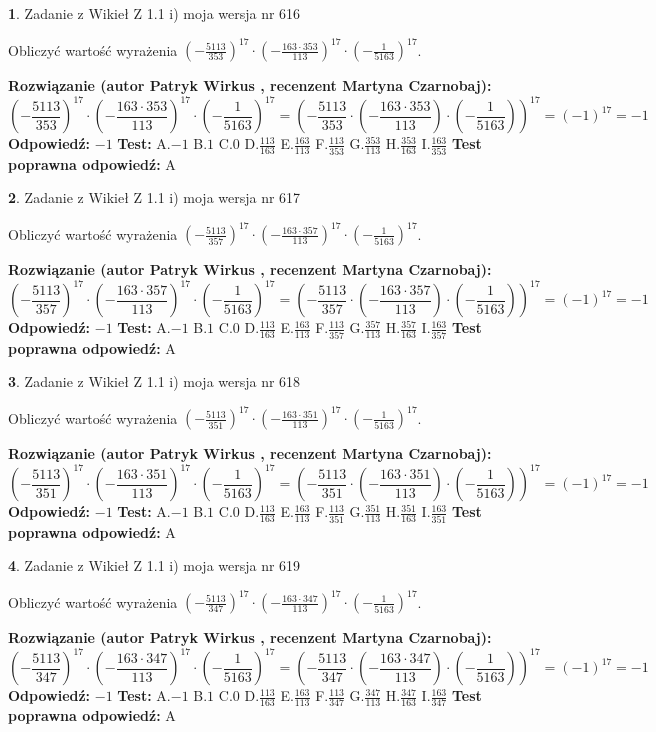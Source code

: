 \documentclass[12pt, a4paper]{article}
\theoremstyle{definition} %
\newtheorem{zad}{}
\newcommand{\zadStart}[1]{\begin{zad}#1\newline}
\newcommand{\zadStop}{\end{zad}}
\newcommand{\rozwStart}[2]{\noindent \textbf{Rozwiązanie (autor #1 , recenzent #2): }\newline}
\newcommand{\rozwStop}{\newline}
\newcommand{\odpStart}{\noindent \textbf{Odpowiedź:}\newline}
\newcommand{\odpStop}{\newline}
\newcommand{\testStart}{\noindent \textbf{Test:}\newline}
\newcommand{\testStop}{\newline}
\newcommand{\kluczStart}{\noindent \textbf{Test poprawna odpowiedź:}\newline}
\newcommand{\kluczStop}{\newline}
\begin{document}
\zadStart{Zadanie z Wikieł Z 1.1 i) moja wersja nr 616}

Obliczyć wartość wyrażenia $(-\frac{5113}{353})^{17} \cdot (-\frac{163 \cdot 353}{113})^{17} \cdot (-\frac{1}{5163})^{17}$.
\zadStop
\rozwStart{Patryk Wirkus}{Martyna Czarnobaj}
$$(-\frac{5113}{353})^{17} \cdot (-\frac{163 \cdot 353}{113})^{17} \cdot (-\frac{1}{5163})^{17} = (-\frac{5113}{353} \cdot (-\frac{163 \cdot 353}{113}) \cdot (-\frac{1}{5163}))^{17} = (-1)^{17} = -1$$
\rozwStop
\odpStart
$-1$
\odpStop
\testStart
A.$-1$ B.$1$ C.$0$ D.$\frac{113}{163}$ E.$\frac{163}{113}$
F.$\frac{113}{353}$ G.$\frac{353}{113}$
H.$\frac{353}{163}$
I.$\frac{163}{353}$
\testStop
\kluczStart
A
\kluczStop



\zadStart{Zadanie z Wikieł Z 1.1 i) moja wersja nr 617}

Obliczyć wartość wyrażenia $(-\frac{5113}{357})^{17} \cdot (-\frac{163 \cdot 357}{113})^{17} \cdot (-\frac{1}{5163})^{17}$.
\zadStop
\rozwStart{Patryk Wirkus}{Martyna Czarnobaj}
$$(-\frac{5113}{357})^{17} \cdot (-\frac{163 \cdot 357}{113})^{17} \cdot (-\frac{1}{5163})^{17} = (-\frac{5113}{357} \cdot (-\frac{163 \cdot 357}{113}) \cdot (-\frac{1}{5163}))^{17} = (-1)^{17} = -1$$
\rozwStop
\odpStart
$-1$
\odpStop
\testStart
A.$-1$ B.$1$ C.$0$ D.$\frac{113}{163}$ E.$\frac{163}{113}$
F.$\frac{113}{357}$ G.$\frac{357}{113}$
H.$\frac{357}{163}$
I.$\frac{163}{357}$
\testStop
\kluczStart
A
\kluczStop



\zadStart{Zadanie z Wikieł Z 1.1 i) moja wersja nr 618}

Obliczyć wartość wyrażenia $(-\frac{5113}{351})^{17} \cdot (-\frac{163 \cdot 351}{113})^{17} \cdot (-\frac{1}{5163})^{17}$.
\zadStop
\rozwStart{Patryk Wirkus}{Martyna Czarnobaj}
$$(-\frac{5113}{351})^{17} \cdot (-\frac{163 \cdot 351}{113})^{17} \cdot (-\frac{1}{5163})^{17} = (-\frac{5113}{351} \cdot (-\frac{163 \cdot 351}{113}) \cdot (-\frac{1}{5163}))^{17} = (-1)^{17} = -1$$
\rozwStop
\odpStart
$-1$
\odpStop
\testStart
A.$-1$ B.$1$ C.$0$ D.$\frac{113}{163}$ E.$\frac{163}{113}$
F.$\frac{113}{351}$ G.$\frac{351}{113}$
H.$\frac{351}{163}$
I.$\frac{163}{351}$
\testStop
\kluczStart
A
\kluczStop



\zadStart{Zadanie z Wikieł Z 1.1 i) moja wersja nr 619}

Obliczyć wartość wyrażenia $(-\frac{5113}{347})^{17} \cdot (-\frac{163 \cdot 347}{113})^{17} \cdot (-\frac{1}{5163})^{17}$.
\zadStop
\rozwStart{Patryk Wirkus}{Martyna Czarnobaj}
$$(-\frac{5113}{347})^{17} \cdot (-\frac{163 \cdot 347}{113})^{17} \cdot (-\frac{1}{5163})^{17} = (-\frac{5113}{347} \cdot (-\frac{163 \cdot 347}{113}) \cdot (-\frac{1}{5163}))^{17} = (-1)^{17} = -1$$
\rozwStop
\odpStart
$-1$
\odpStop
\testStart
A.$-1$ B.$1$ C.$0$ D.$\frac{113}{163}$ E.$\frac{163}{113}$
F.$\frac{113}{347}$ G.$\frac{347}{113}$
H.$\frac{347}{163}$
I.$\frac{163}{347}$
\testStop
\kluczStart
A
\kluczStop
\end{document}
